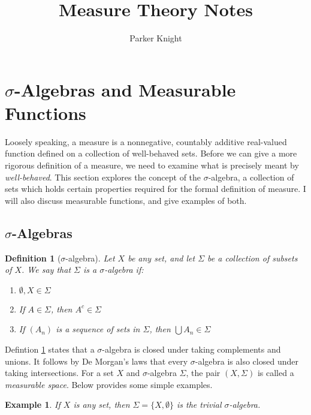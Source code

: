 \documentclass{amsart}
\title{Measure Theory Notes}
\author{Parker Knight}
\newtheorem{definition}[theorem]{Definition}
\newtheorem{example}[theorem]{Example}
\begin{document}
\maketitle
\tableofcontents
\newpage

\section{$\sigma$-Algebras and Measurable Functions} 

Loosely speaking, a measure is a nonnegative, countably additive real-valued
function defined on a collection of
well-behaved sets. Before we can give a more rigorous definition of a measure,
we need to examine what is precisely meant by \textit{well-behaved}. This
section explores the concept of the $\sigma$-algebra, a collection of sets which
holds certain properties required for the formal definition of measure.
I will also discuss measurable functions, and give examples of both.

\subsection{$\sigma$-Algebras}

\begin{definition}[$\sigma$-algebra]\label{def:sigma-alg}
    Let $X$ be any set, and let $\Sigma$ be a collection of subsets of $X$.
    We say that $\Sigma$ is a \textit{$\sigma$-algebra} if:
    \begin{enumerate}
        \item $\emptyset, X \in \Sigma$
        \item If $A \in \Sigma$, then $A^c \in \Sigma$
        \item If $(A_n)$ is a sequence of sets in $\Sigma$, then $\bigcup A_n
        \in \Sigma$
    \end{enumerate}
    
\end{definition}

Defintion \ref{def:sigma-alg} states that a $\sigma$-algebra is closed under
taking complements and unions. It follows by De Morgan's laws that every
$\sigma$-algebra is also closed under taking intersections. For a set $X$ and
$\sigma$-algebra $\Sigma$, the pair $(X, \Sigma)$ is called a \textit{measurable
space}. Below provides some simple examples.

\begin{example}
    If $X$ is any set, then $\Sigma = \{ X, \emptyset \}$ is the trivial
    $\sigma$-algebra.
\end{example}
\end{document}
